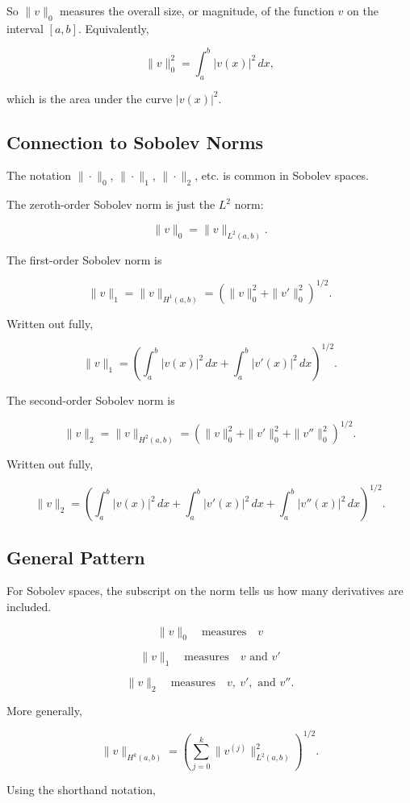 \documentclass[../main.tex]{subfiles}
\begin{document}
So \(\|v\|_0\) measures the overall size, or magnitude, of the function \(v\) on the interval \([a,b]\). Equivalently,

\[
\|v\|_0^2
=
\int_a^b |v(x)|^2 \, dx,
\]

which is the area under the curve \(|v(x)|^2\).

\subsection*{Connection to Sobolev Norms}

The notation \(\|\cdot\|_0\), \(\|\cdot\|_1\), \(\|\cdot\|_2\), etc. is common in Sobolev spaces.

The zeroth-order Sobolev norm is just the \(L^2\) norm:

\[
\|v\|_0 = \|v\|_{L^2(a,b)}.
\]

The first-order Sobolev norm is

\[
\|v\|_1 = \|v\|_{H^1(a,b)}
=
\left(
\|v\|_0^2 + \|v'\|_0^2
\right)^{1/2}.
\]

Written out fully,

\[
\|v\|_1
=
\left(
\int_a^b |v(x)|^2 \, dx
+
\int_a^b |v'(x)|^2 \, dx
\right)^{1/2}.
\]

The second-order Sobolev norm is

\[
\|v\|_2 = \|v\|_{H^2(a,b)}
=
\left(
\|v\|_0^2
+
\|v'\|_0^2
+
\|v''\|_0^2
\right)^{1/2}.
\]

Written out fully,

\[
\|v\|_2
=
\left(
\int_a^b |v(x)|^2 \, dx
+
\int_a^b |v'(x)|^2 \, dx
+
\int_a^b |v''(x)|^2 \, dx
\right)^{1/2}.
\]

\subsection*{General Pattern}

For Sobolev spaces, the subscript on the norm tells us how many derivatives are included.

\[
\|v\|_0
\quad \text{measures} \quad
v
\]

\[
\|v\|_1
\quad \text{measures} \quad
v \text{ and } v'
\]

\[
\|v\|_2
\quad \text{measures} \quad
v, \ v', \text{ and } v''.
\]

More generally,

\[
\|v\|_{H^k(a,b)}
=
\left(
\sum_{j=0}^k \|v^{(j)}\|_{L^2(a,b)}^2
\right)^{1/2}.
\]

Using the shorthand notation,
\end{document}
